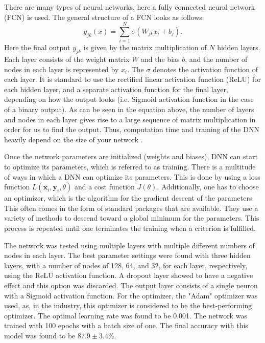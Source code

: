 \documentclass{article}
\begin{document}
There are many types of neural networks, here a fully connected neural network (FCN) is used. The general structure of a FCN looks as follows:
\begin{equation}
    y_{jk}(x) = \sum^N_{i=1}\sigma(W_{jk}x_i+b_{j}).
\end{equation}
Here the final output $y_{jk}$ is given by the matrix multiplication of $N$ hidden layers. Each layer consists of the weight matrix $W$ and the bias $b$, and the number of nodes in each layer is represented by $x_i$. The $\sigma$ denotes the activation function of each layer. It is standard to use the rectified linear activation function (ReLU) for each hidden layer, and a separate activation function for the final layer, depending on how the output looks (i.e. Sigmoid activation function in the case of a binary output). As can be seen in the equation above, the number of layers and nodes in each layer gives rise to a large sequence of matrix multiplication in order for us to find the output. Thus, computation time and training of the DNN heavily depend on the size of your network \cite{smlbook}.

Once the network parameters are initialized (weights and biases), DNN can start to optimize its parameters, which is referred to as training. There is a multitude of ways in which a DNN can optimize its parameters. This is done by using a loss function $L(\textbf{x}_i,\textbf{y}_i,\theta)$ and a cost function $J(\theta)$. Additionally, one has to choose an optimizer, which is the algorithm for the gradient descent of the parameters. This often comes in the form of standard packages that are available. They use a variety of methods to descend toward a global minimum for the parameters. This process is repeated until one terminates the training when a criterion is fulfilled.

The network was tested using multiple layers with multiple different numbers of nodes in each layer. The best parameter settings were found with three hidden layers, with a number of nodes of 128, 64, and 32, for each layer, respectively, using the ReLU activation function. A dropout layer showed to have a negative effect and this option was discarded. The output layer consists of a single neuron with a Sigmoid activation function. For the optimizer, the "Adam" optimizer was used, as, in the industry, this optimizer is considered to be the best-performing optimizer. The optimal learning rate was found to be 0.001. The network was trained with 100 epochs with a batch size of one. The final accuracy with this model was found to be $87.9 \pm 3.4\%$.
\end{document}
